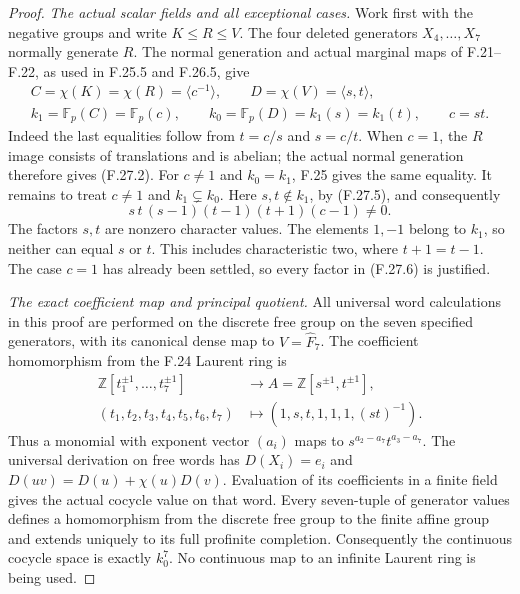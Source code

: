 \begin{proof}
\emph{The actual scalar fields and all exceptional cases.}
Work first with the negative groups and write
$K\leq R\leq V$. The four deleted generators
$X_4,\ldots,X_7$ normally generate $R$.
The normal generation and actual marginal maps
of F.21--F.22, as used in F.25.5 and F.26.5, give
\[
 \begin{gathered}
 C=\chi(K)=\chi(R)=\langle c^{-1}\rangle,\qquad
 D=\chi(V)=\langle s,t\rangle,\\
 k_1=\mathbb F_p(C)=\mathbb F_p(c),\qquad
 k_0=\mathbb F_p(D)=k_1(s)=k_1(t),\qquad c=st.
 \end{gathered}                                                \tag{F.27.5}
\]
Indeed the last equalities follow from $t=c/s$ and
$s=c/t$. When $c=1$, the $R$ image consists of
translations and is abelian; the actual normal
generation therefore gives (F.27.2). For $c\ne1$
and $k_0=k_1$, F.25 gives the same equality.
It remains to treat $c\ne1$ and $k_1\subsetneq k_0$.
Here $s,t\notin k_1$, by (F.27.5), and consequently
\[
             s\,t\,(s-1)(t-1)(t+1)(c-1)\ne0.
                                                               \tag{F.27.6}
\]
The factors $s,t$ are nonzero character values.
The elements $1,-1$ belong to $k_1$, so neither
can equal $s$ or $t$. This includes characteristic
two, where $t+1=t-1$. The case $c=1$ has already
been settled, so every factor in (F.27.6) is justified.

\emph{The exact coefficient map and principal quotient.}
All universal word calculations in this proof are
performed on the discrete free group on the seven
specified generators, with its canonical dense map
to $V=\widehat F_7$. The coefficient homomorphism
from the F.24 Laurent ring is
\[
 \begin{aligned}
 \mathbb Z[t_1^{\pm1},\ldots,t_7^{\pm1}]&\longrightarrow
                  A=\mathbb Z[s^{\pm1},t^{\pm1}],\\
 (t_1,t_2,t_3,t_4,t_5,t_6,t_7)
           &\longmapsto(1,s,t,1,1,1,(st)^{-1}).
 \end{aligned}                                                \tag{F.27.7}
\]
Thus a monomial with exponent vector $(a_i)$ maps
to $s^{a_2-a_7}t^{a_3-a_7}$. The universal
derivation on free words has $D(X_i)=e_i$ and
$D(uv)=D(u)+\chi(u)D(v)$. Evaluation of its
coefficients in a finite field gives the actual
cocycle value on that word. Every seven-tuple
of generator values defines a homomorphism from
the discrete free group to the finite affine
group and extends uniquely to its full profinite
completion. Consequently the continuous cocycle
space is exactly $k_0^7$. No continuous map to
an infinite Laurent ring is being used.


\end{proof}

